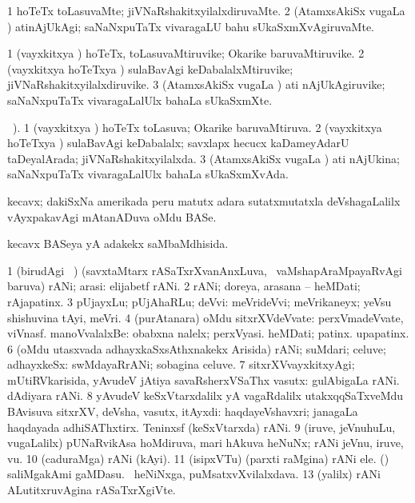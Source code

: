 \bentry
{} 
\gl{\kirxvi}
\expl{ }
\bmng
\bnum
\num{1} hoTeTx toLasuvaMte; jiVNaRshakitxyilalxdiruvaMte. 
\num{2} (AtamxsAkiSx \mo vugaLa \vi) atinAjUkAgi; saNaNxpuTaTx vivaragaLU bahu sUkaSxmXvAgiruvaMte. 
\enum
\emng
\eentry

\bentry
{} 
\gl{\nA}
\expl{}
\bmng
\bnum
\num{1} (vayxkitxya \vi) hoTeTx, toLasuvaMtiruvike; Okarike baruvaMtiruvike. 
\num{2} (vayxkitxya hoTeTxya \vi) sulaBavAgi keDabalalxMtiruvike; jiVNaRshakitxyilalxdiruvike. 
\num{3} (AtamxsAkiSx \mo vugaLa \vi) ati nAjUkAgiruvike; saNaNxpuTaTx vivaragaLalUlx bahaLa sUkaSxmXte. 
\enum
\emng
\eentry

\bentry
{} 
\gl{\gu}
\tama\ ). \bmng
\bnum
\num{1} (vayxkitxya \vi) hoTeTx toLasuva; Okarike baruvaMtiruva. 
\num{2} (vayxkitxya hoTeTxya \vi) sulaBavAgi keDabalalx; savxlapx hecucx kaDameyAdarU taDeyalArada; jiVNaRshakitxyilalxda. 
\num{3} (AtamxsAkiSx \mo vugaLa \vi) ati nAjUkina; saNaNxpuTaTx vivaragaLalUlx bahaLa sUkaSxmXvAda. 
\enum
\emng
\eentry

\bentry
{} 
\gl{\nA}
\bmng
kecavx; dakiSxNa amerikada peru matutx adara sutatxmutatxla deVshagaLalilx vAyxpakavAgi mAtanADuva oMdu BASe. 
\emng
\eentry

\bentry
{} 
\gl{\gu}
\expl{}
\bmng
kecavx BASeya yA adakekx saMbaMdhisida. 
\emng
\eentry

\bentry
{} 
\gl{\nA}
\expl{}
\bmng
\bnum
\num{1} (birudAgi \sA\ ) (savxtaMtarx rASaTxrXvanAnxLuva, \kanmu\ vaMshapAraMpayaRvAgi baruva) rANi; arasi:  elijabetf rANi. 
\hypertarget{queen(1)2}{} 
\num{2} rANi; doreya, arasana -- heMDati; rAjapatinx. 
\num{3} pUjayxLu; pUjAhaRLu; deVvi:  meVrideVvi; meVrikaneyx; yeVsu shishuvina tAyi, meVri. 
\num{4} (purAtanara) oMdu sitxrXVdeVvate:  perxVmadeVvate, viVnasf. 
 manoVvalalxBe: 
\banum
{} obabxna nalelx; perxVyasi. 
 heMDati; patinx. 
 upapatinx. 
\eanum
\numie
\num{6} (oMdu utasxvada adhayxkaSxsAthxnakekx Arisida) rANi; suMdari; celuve; adhayxkeSx:  swMdayaRrANi; sobagina celuve. 
\num{7} sitxrXVvayxkitxyAgi; mUtiRVkarisida, yAvudeV jAtiya savaRsherxVSaThx vasutx:  gulAbigaLa rANi.  dAdiyara rANi. 
\num{8} yAvudeV keSxVtarxdalilx yA vagaRdalilx utakxqqSaTxveMdu BAvisuva sitxrXV, deVsha, vasutx, itAyxdi:  haqdayeVshavxri; janagaLa haqdayada adhiSAThxtirx.  Teninxsf (keSxVtarxda) rANi. 
\num{9} (iruve, jeVnuhuLu, \mo vugaLalilx) pUNaRvikAsa hoMdiruva, mari hAkuva heNuNx; rANi jeVnu, iruve, \mo vu. 
\num{10} (caduraMga) rANi (kAyi). 
\num{11} (isipxVTu) (parxti raMgina) rANi ele. 
\hypertarget{queen(1)12}{} 
 (\ashi) 
\banum
{} saliMgakAmi gaMDasu. 
 \kanmu\ heNiNxga, puMsatxvXvilalxdava. 
\eanum
\numie
\num{13} (\UK yalilx) rANi ALutitxruvAgina rASaTxrXgiVte. 
\enum
\emng

